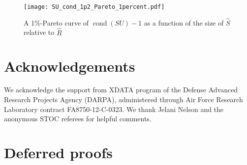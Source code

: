 \documentclass{sig-alternate}
\DeclareMathOperator{\cond}{\mathrm{cond}}
\begin{document}
\begin{figure*}
\begin{center}
  \texttt{[image: SU\_cond\_1p2\_Pareto\_1percent.pdf]} 
 \end{center}
\caption{A 1\%-Pareto curve of $\cond(SU)-1$  as a function of the size of $\hat S$ relative to $\hat R$}
\end{figure*}





\fi 




\section*{Acknowledgements}
We acknowledge the support from XDATA program of the Defense Advanced Research Projects Agency (DARPA), administered through Air Force Research Laboratory contract FA8750-12-C-0323.
We thank Jelani Nelson and the anonymous STOC referees for helpful comments.







\ifSTOC\else
\appendix

\section{Deferred proofs}
\end{document}
